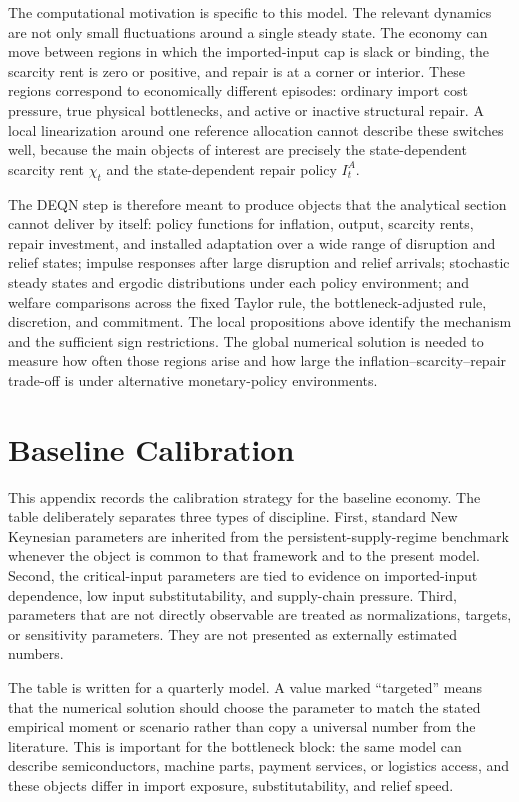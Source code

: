 ﻿\documentclass[12pt]{article}
\theoremstyle{remark}
\begin{document}
The computational motivation is specific to this model. The relevant dynamics are not only small
fluctuations around a single steady state. The economy can move between regions in which the
imported-input cap is slack or binding, the scarcity rent is zero or positive, and repair is at a
corner or interior. These regions correspond to economically different episodes: ordinary import
cost pressure, true physical bottlenecks, and active or inactive structural repair. A local
linearization around one reference allocation cannot describe these switches well, because the main
objects of interest are precisely the state-dependent scarcity rent $\chi_t$ and the state-dependent
repair policy $I_t^A$.

The DEQN step is therefore meant to produce objects that the analytical section cannot deliver by
itself: policy functions for inflation, output, scarcity rents, repair investment, and installed
adaptation over a wide range of disruption and relief states; impulse responses after large
disruption and relief arrivals; stochastic steady states and ergodic distributions under each
policy environment; and welfare comparisons across the fixed Taylor rule, the bottleneck-adjusted
rule, discretion, and commitment. The local propositions above identify the mechanism and the
sufficient sign restrictions. The global numerical solution is needed to measure how often those
regions arise and how large the inflation--scarcity--repair trade-off is under alternative
monetary-policy environments.

\appendix

\section{Baseline Calibration}
\label{app:baseline_calibration}

This appendix records the calibration strategy for the baseline economy. The table deliberately
separates three types of discipline. First, standard New Keynesian parameters are inherited from
the persistent-supply-regime benchmark whenever the object is common to that framework and to the
present model. Second, the critical-input parameters are tied to evidence on imported-input
dependence, low input substitutability, and supply-chain pressure. Third, parameters that are not
directly observable are treated as normalizations, targets, or sensitivity parameters. They are not
presented as externally estimated numbers.

The table is written for a quarterly model. A value marked ``targeted'' means that the numerical
solution should choose the parameter to match the stated empirical moment or scenario rather than
copy a universal number from the literature. This is important for the bottleneck block: the same
model can describe semiconductors, machine parts, payment services, or logistics access, and these
objects differ in import exposure, substitutability, and relief speed.
\end{document}
